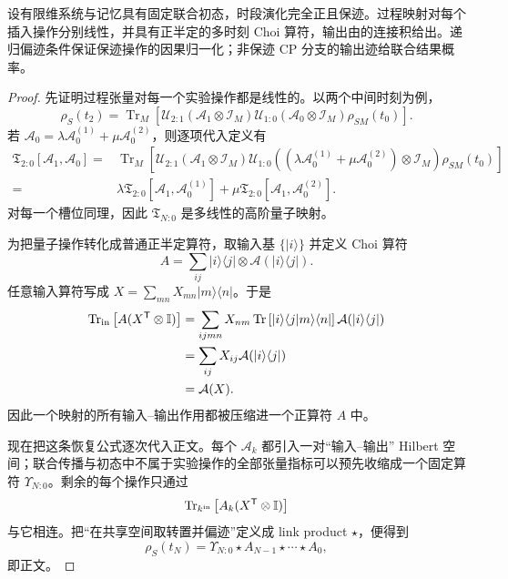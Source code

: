 \begin{theorem}
设有限维系统与记忆具有固定联合初态，时段演化完全正且保迹。过程映射对每个插入操作分别线性，并具有正半定的多时刻 Choi 算符，输出由的连接积给出。递归偏迹条件保证保迹操作的因果归一化；非保迹 CP 分支的输出迹给联合结果概率。
\end{theorem}
\begin{proof}
先证明过程张量对每一个实验操作都是线性的。以两个中间时刻为例，
\[
\rho_S(t_2)
=\operatorname{Tr}_M\!
\left[
\mathcal U_{2:1}(\mathcal A_1\otimes\mathcal I_M)
\mathcal U_{1:0}(\mathcal A_0\otimes\mathcal I_M)
\rho_{SM}(t_0)
\right].
\]
若
$\mathcal A_0=\lambda\mathcal A_0^{(1)}+\mu\mathcal A_0^{(2)}$，则逐项代入定义有
\begin{align*}
\mathfrak T_{2:0}[\mathcal A_1,\mathcal A_0]
={}&\operatorname{Tr}_M\!\left[
\mathcal U_{2:1}(\mathcal A_1\otimes\mathcal I_M)
\mathcal U_{1:0}((\lambda\mathcal A_0^{(1)}+\mu\mathcal A_0^{(2)})\otimes\mathcal I_M)
\rho_{SM}(t_0)\right]\\
={}&\lambda\mathfrak T_{2:0}[\mathcal A_1,\mathcal A_0^{(1)}]
+\mu\mathfrak T_{2:0}[\mathcal A_1,\mathcal A_0^{(2)}].
\end{align*}
对每一个槽位同理，因此 $\mathfrak T_{N:0}$ 是多线性的高阶量子映射。

为把量子操作转化成普通正半定算符，取输入基 $\{|i\rangle\}$ 并定义 Choi 算符
\[
A
=\sum_{ij}|i\rangle\langle j|\otimes
\mathcal A(|i\rangle\langle j|).
\]
任意输入算符写成
$X=\sum_{mn}X_{mn}|m\rangle\langle n|$。于是
\begin{align*}
\operatorname{Tr}_{\rm in}
\left[A(X^{\mathsf T}\otimes\mathbb I)\right]
&=\sum_{ijmn}X_{nm}
\operatorname{Tr}
\left[|i\rangle\langle j|m\rangle\langle n|\right]
\mathcal A(|i\rangle\langle j|)\\
&=\sum_{ij}X_{ij}\mathcal A(|i\rangle\langle j|)\\
&=\mathcal A(X).
\end{align*}
因此一个映射的所有输入--输出作用都被压缩进一个正算符 $A$ 中。

现在把这条恢复公式逐次代入正文。每个 $\mathcal A_k$ 都引入一对“输入--输出” Hilbert 空间；联合传播与初态中不属于实验操作的全部张量指标可以预先收缩成一个固定算符 $\Upsilon_{N:0}$。剩余的每个操作只通过
\[
\operatorname{Tr}_{k^{\rm in}}
\left[A_k(X^{\mathsf T}\otimes\mathbb I)\right]
\]
与它相连。把“在共享空间取转置并偏迹”定义成 link product $\star$，便得到
\[
\rho_S(t_N)
=\Upsilon_{N:0}\star A_{N-1}\star\cdots\star A_0,
\]
即正文。


\end{proof}
